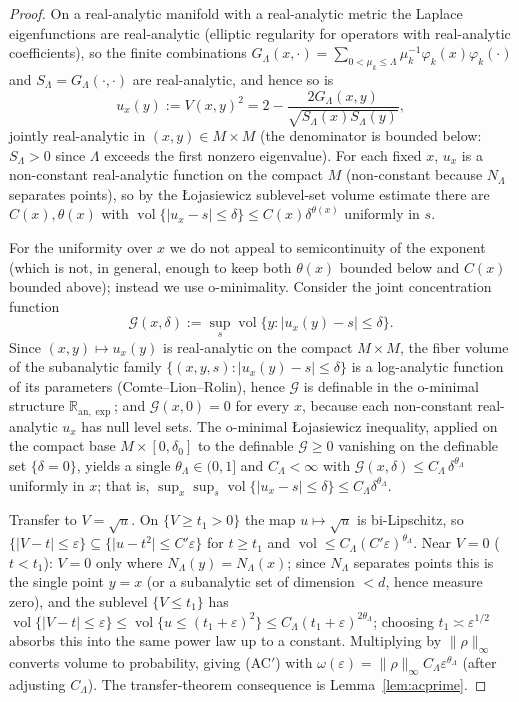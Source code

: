 \documentclass[11pt]{article}
\theoremstyle{remark}
\newcommand{\vol}{\operatorname{vol}}
\newcommand{\NL}{N_\Lambda}
\begin{document}
\begin{proof}
On a real-analytic manifold with a real-analytic metric the Laplace eigenfunctions are
real-analytic (elliptic regularity for operators with real-analytic coefficients), so the
finite combinations $G_\Lambda(x,\cdot)=\sum_{0<\mu_k\le\Lambda}\mu_k^{-1}\varphi_k(x)\varphi_k(\cdot)$
and $S_\Lambda=G_\Lambda(\cdot,\cdot)$ are real-analytic, and hence so is
\[
u_x(y):=V(x,y)^2=2-\frac{2G_\Lambda(x,y)}{\sqrt{S_\Lambda(x)S_\Lambda(y)}} ,
\]
jointly real-analytic in $(x,y)\in M\times M$ (the denominator is bounded below: $S_\Lambda>0$
since $\Lambda$ exceeds the first nonzero eigenvalue). For each fixed $x$, $u_x$ is a
non-constant real-analytic function on the compact $M$ (non-constant because $\NL$
separates points), so by the \L ojasiewicz sublevel-set volume estimate there are
$C(x),\theta(x)$ with $\vol\{\lvert u_x-s\rvert\le\delta\}\le C(x)\delta^{\theta(x)}$
uniformly in $s$.

For the uniformity over $x$ we do not appeal to semicontinuity of the exponent (which is
not, in general, enough to keep both $\theta(x)$ bounded below and $C(x)$ bounded above);
instead we use o-minimality. Consider the joint concentration function
\[
\mathcal G(x,\delta):=\sup_s\vol\bigl\{y:\lvert u_x(y)-s\rvert\le\delta\bigr\}.
\]
Since $(x,y)\mapsto u_x(y)$ is real-analytic on the compact $M\times M$, the fiber volume
of the subanalytic family $\{(x,y,s):\lvert u_x(y)-s\rvert\le\delta\}$ is a log-analytic
function of its parameters (Comte--Lion--Rolin), hence $\mathcal G$ is definable in the
o-minimal structure $\mathbb R_{\mathrm{an},\exp}$; and $\mathcal G(x,0)=0$ for every $x$,
because each non-constant real-analytic $u_x$ has null level sets. The o-minimal
\L ojasiewicz inequality, applied on the compact base $M\times[0,\delta_0]$ to the
definable $\mathcal G\ge0$ vanishing on the definable set $\{\delta=0\}$, yields a single
$\theta_\Lambda\in(0,1]$ and $C_\Lambda<\infty$ with
$\mathcal G(x,\delta)\le C_\Lambda\,\delta^{\theta_\Lambda}$ uniformly in $x$; that is,
$\sup_x\sup_s\vol\{\lvert u_x-s\rvert\le\delta\}\le C_\Lambda\delta^{\theta_\Lambda}$.

Transfer to $V=\sqrt{u}$. On $\{V\ge t_1>0\}$ the map $u\mapsto\sqrt u$ is bi-Lipschitz,
so $\{\lvert V-t\rvert\le\varepsilon\}\subseteq\{\lvert u-t^2\rvert\le C'\varepsilon\}$ for
$t\ge t_1$ and $\vol\le C_\Lambda(C'\varepsilon)^{\theta_\Lambda}$. Near $V=0$
($t<t_1$): $V=0$ only where $\NL(y)=\NL(x)$; since $\NL$ separates points this is the
single point $y=x$ (or a subanalytic set of dimension $<d$, hence measure zero), and the
sublevel $\{V\le t_1\}$ has $\vol\{\lvert V-t\rvert\le\varepsilon\}\le\vol\{u\le(t_1+\varepsilon)^2\}
\le C_\Lambda(t_1+\varepsilon)^{2\theta_\Lambda}$; choosing $t_1\asymp\varepsilon^{1/2}$
absorbs this into the same power law up to a constant. Multiplying by
$\lVert\rho\rVert_\infty$ converts volume to probability, giving (AC$'$) with
$\omega(\varepsilon)=\lVert\rho\rVert_\infty C_\Lambda\varepsilon^{\theta_\Lambda}$
(after adjusting $C_\Lambda$). The transfer-theorem consequence is Lemma~\ref{lem:acprime}.
\end{proof}
\end{document}
